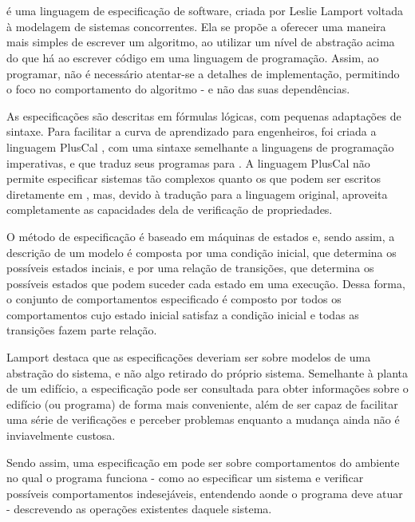 \chapter{\TLA}
\label{cap2}

\TLA é uma linguagem de especificação de software, criada por Leslie Lamport \cite{tlahistory} voltada à modelagem de sistemas concorrentes. Ela se propõe a oferecer uma maneira mais simples de escrever um algoritmo, ao utilizar um nível de abstração acima do que há ao escrever código em uma linguagem de programação. Assim, ao programar, não é necessário atentar-se a detalhes de implementação, permitindo o foco no comportamento do algoritmo - e não das suas dependências.

As especificações são descritas em fórmulas lógicas, com pequenas adaptações de sintaxe. Para facilitar a curva de aprendizado para engenheiros, foi criada a linguagem PlusCal \cite{pluscal}, com uma sintaxe semelhante a linguagens de programação imperativas, e que traduz seus programas para \TLA. A linguagem PlusCal não permite especificar sistemas tão complexos quanto os que podem ser escritos diretamente em \TLA, mas, devido à tradução para a linguagem original, aproveita completamente as capacidades dela de verificação de propriedades.

O método de especificação é baseado em máquinas de estados \cite{tlahistory} e, sendo assim, a descrição de um modelo é composta por uma condição inicial, que determina os possíveis estados inciais, e por uma relação de transições, que determina os possíveis estados que podem suceder cada estado em uma execução. Dessa forma, o conjunto de comportamentos especificado é composto por todos os comportamentos cujo estado inicial satisfaz a condição inicial e todas as transições fazem parte relação.

Lamport destaca \cite{hyperbook} que as especificações deveriam ser sobre modelos de uma abstração do sistema, e não algo retirado do próprio sistema. Semelhante à planta de um edifício, a especificação pode ser consultada para obter informações sobre o edifício (ou programa) de forma mais conveniente, além de ser capaz de facilitar uma série de verificações e perceber problemas enquanto a mudança ainda não é inviavelmente custosa.

Sendo assim, uma especificação em \TLA pode ser sobre comportamentos do ambiente no qual o programa funciona - como ao especificar um sistema e verificar possíveis comportamentos indesejáveis, entendendo aonde o programa deve atuar - descrevendo as operações existentes daquele sistema.

